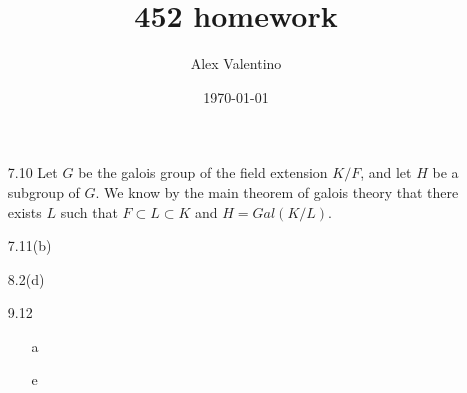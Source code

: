 \documentclass[12pt, letterpaper]{article}
\date{\today}
\author{Alex Valentino}
\title{452 homework}
\begin{document}
\begin{enumerate}
	\item[7.10] Let $G$ be the galois group of the field extension $K/F$, and let $H$ be a subgroup of $G$.  We know 
	by the main theorem of galois theory that there exists $L$ such that $F \subset L \subset K$ and $H = Gal(K/L)$.  
	 
	\item[7.11(b)]
	\item[8.2(d)]
	\item[9.12]
	\begin{enumerate}
		\item[a]
		\item[e]
	\end{enumerate}
\end{enumerate}
\end{document}
